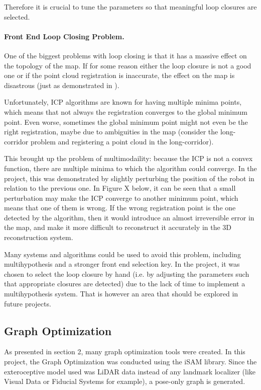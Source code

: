 \documentclass[12pt]{article}
\begin{document}
Therefore it is crucial to tune the parameters so that meaningful loop closures are selected. 

\paragraph{Front End Loop Closing Problem.} One of the biggest problems with loop closing is that it has a massive effect on the topology of the map. If for some reason either the loop closure is not a good one or if the point cloud registration is inaccurate, the effect on the map is disastrous (just as demonstrated in \cite{latif2013robust}).
	
Unfortunately, ICP algorithms are known for having multiple minima points, which means that not always the registration converges to the global minimum point. Even worse, sometimes the global minimum point might not even be the right registration, maybe due to ambiguities in the map (consider the long-corridor problem and registering a point cloud in the long-corridor).
	
This brought up the problem of multimodaility: because the ICP is not a convex function, there are multiple minima to which the algorithm could converge. In the project, this was demonstrated by slightly perturbing the position of the robot in relation to the previous one. In Figure X below, it can be seen that a small perturbation may make the ICP converge to another minimum point, which means that one of them is wrong. If the wrong registration point is the one detected by the algorithm, then it would introduce an almost irreversible error in the map, and make it more difficult to reconstruct it accurately in the 3D reconstruction system.
	
Many systems and algorithms could be used to avoid this problem, including multihypothesis and a stronger front end selection key. In the project, it was chosen to select the loop closure by hand (i.e. by adjusting the parameters such that appropriate closures are detected) due to the lack of time to implement a multihypothesis system. That is however an area that should be explored in future projects.

	\subsection{Graph Optimization}
	\label{subs:GraphOpt}

As presented in section 2, many graph optimization tools were created. In this project, the Graph Optimization was conducted using the iSAM library. Since the exteroceptive model used was LiDAR data instead of any landmark localizer (like Visual Data or Fiducial Systems for example), a pose-only graph is generated.
\end{document}
